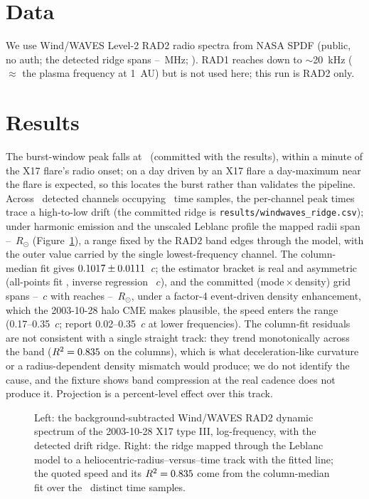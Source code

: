 \documentclass[twocolumn]{aastex631}
\newcommand{\code}[1]{\texttt{#1}}
\begin{document}
\section{Data}
We use Wind/WAVES Level-2 RAD2 radio spectra from NASA SPDF (public, no auth; the detected ridge spans \wwRealFlo--\wwRealFhi~MHz;
\citealt{bougeret1995}). RAD1 reaches down to $\sim$20~kHz ($\approx$ the plasma frequency at 1~AU) but
is not used here; this run is RAD2 only.

\section{Results}
The burst-window peak falls at \wwRealPeakUTC\ (committed with the results), within a minute of
the X17 flare's radio onset; on a day driven by an X17 flare a day-maximum near the flare is
expected, so this locates the burst rather than validates the pipeline. Across \wwRealNridge\
detected channels occupying \wwRealNtimeCols\ time samples, the per-channel peak times trace a
high-to-low drift (the committed ridge is \code{results/windwaves\_ridge.csv}); under harmonic
emission and the unscaled Leblanc profile the mapped radii span \wwRealRlo--\wwRealRhi~$R_\odot$ (Figure~\ref{fig:ipburst}), a range fixed by the RAD2 band edges through the model, with the
outer value carried by the single lowest-frequency channel. The column-median fit gives
$0.1017\pm0.0111$~$c$; the estimator bracket is real and asymmetric (all-points
fit \wwRealSpeedCPoints, inverse regression \wwRealSpeedCInverse~$c$), and the committed
(mode\,$\times$\,density) grid spans \wwRealGridSpeedLo--\wwRealGridSpeedHi~$c$ with reaches \wwRealGridReachLo--\wwRealGridReachHi~$R_\odot$, under a factor-4 event-driven density enhancement, which the 2003-10-28 halo CME makes plausible, the speed enters the
\citet{reiner2015} range (0.17--0.35~$c$; \citealt{krupar2015} report 0.02--0.35~$c$ at lower
frequencies). The column-fit residuals are not consistent with a single straight track: they
trend monotonically across the band ($R^2=0.835$ on the columns), which is what
deceleration-like curvature or a radius-dependent density mismatch would produce; we do not
identify the cause, and the fixture shows band compression at the real cadence does not produce
it. Projection is a percent-level effect over this track.

\begin{figure}
\caption{Left: the background-subtracted Wind/WAVES RAD2 dynamic spectrum of the 2003-10-28 X17
type III, log-frequency, with the detected drift ridge. Right: the ridge mapped through the
Leblanc model to a heliocentric-radius--versus--time track with the fitted line; the quoted
speed and its $R^2=0.835$ come from the column-median fit over the \wwRealNtimeCols\
distinct time samples.}
\label{fig:ipburst}
\end{figure}
\end{document}
